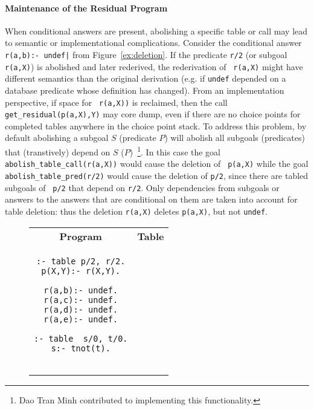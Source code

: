 \begin{description}
 
\paragraph{Maintenance of the Residual Program}
When conditional answers are present, abolishing a specific table or
call may lead to semantic or implementational complications.  Consider
the conditional answer {\tt r(a,b):- undef|} from
Figure~\ref{ex:deletion}.  If the predicate {\tt r/2} (or subgoal {\tt
  r(a,X)}) is abolished and later rederived, the rederivation of {\tt
  r(a,X)} might have different semantics than the original derivation
(e.g. if {\tt undef} depended on a database predicate whose definition
has changed).  From an implementation perspective, if space for {\tt
  r(a,X))} is reclaimed, then the call {\tt get\_residual(p(a,X),Y)}
may core dump, even if there are no choice points for completed tables
anywhere in the choice point stack.  To address this problem, by
default abolishing a subgoal $S$ (predicate $P$) will abolish all
subgoals (predicates) that (transtively) depend on $S$
($P$)~\footnote{Dao Tran Minh contributed to implementing this
  functionality.}.  In this case the goal {\tt
  abolish\_table\_call(r(a,X))} would cause the deletion of {\tt
  p(a,X)} while the goal {\tt abolish\_table\_pred(r/2)} would cause
the deletion of {\tt p/2}, since there are tabled subgoals of {\tt
  p/2} that depend on {\tt r/2}.  Only dependencies from subgoals or
answers to the answers that are conditional on them are taken into
account for table deletion: thus the deletion {\tt r(a,X)} deletes
{\tt p(a,X)}, but not {\tt undef}.

\begin{figure}[htb]
\begin{center}
\begin{tabular}{cc}\hline \hline
\rule[-2ex]{0ex}{5ex} \textbf{Program} & \textbf{Table} \\
\begin{minipage}{14.5em}
\begin{verbatim}
:- table p/2, r/2.
p(X,Y):- r(X,Y).

r(a,b):- undef.
r(a,c):- undef.
r(a,d):- undef.
r(a,e):- undef.

:- table  s/0, t/0.
s:- tnot(t).


\end{verbatim}
\end{minipage}
\end{tabular}
\end{center}
\end{figure}
\end{description}
